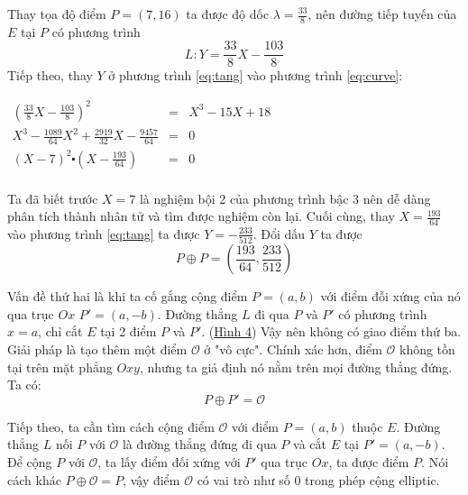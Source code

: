 Thay tọa độ điểm $P = (7,16)$ ta được độ dốc $\lambda = \frac{33}{8}$, nên đường tiếp tuyến của $E$ tại $P$ có phương trình
\begin{equation}
	\label{eq:tang}
	L: Y = \frac{33}{8}X - \frac{103}{8}
\end{equation}
Tiếp theo, thay $Y$ ở phương trình \eqref{eq:tang} vào phương trình \eqref{eq:curve}:
\begin{center}

	$
		\begin{array}{rcl}
			(\frac{33}{8}X - \frac{103}{8})^2                             & = & X^3 -15X+18 \\
			X^3 - \frac{1089}{64}X^2 + \frac{2919}{32}X - \frac{9457}{64} & = & 0           \\
			(X-7)^2 \centerdot (X-\frac{193}{64})                         & = & 0           \\
		\end{array}
	$
\end{center}
Ta đã biết trước $X=7$ là nghiệm bội 2 của phương trình bậc 3 nên dễ dàng phân tích thành nhân tử và tìm được nghiệm còn lại.
Cuối cùng, thay $X=\frac{193}{64}$ vào phương trình \eqref{eq:tang} ta được $Y = -\frac{233}{512}$. Đổi dấu  $Y$ ta được
$$P \oplus P = (\frac{193}{64},\frac{233}{512})$$

Vấn đề thứ hai là khi ta cố gắng cộng điểm $P=(a,b)$ với điểm đỗi xứng của nó qua trục $Ox$ $P'=(a,-b)$.
Đường thẳng $L$ đi qua $P$ và $P'$ có phương trình $x=a$, chỉ cắt $E$ tại 2 điểm $P$ và $P'$. (\hyperref[fg:fg4]{Hình 4})
Vậy nên không có giao điểm thứ ba. Giải pháp là tạo thêm một điểm $\mathcal{O}$ ở "vô cực".
Chính xác hơn, điểm $\mathcal{O}$ không tồn tại trên mặt phẳng $ Oxy$, nhưng ta giả định nó nằm trên mọi đường thẳng đứng.
Ta có:
$$ P \oplus P' = \mathcal{O}$$

Tiếp theo, ta cần tìm cách  cộng điểm $\mathcal{O}$ với điểm $P = (a,b)$ thuộc $E$.
Đường thẳng $L$ nối $P$ với $\mathcal{O}$ là đường thẳng đứng đi qua $P$ và cắt $E$ tại $P'=(a,-b)$.
Để cộng $P$ với $\mathcal{O}$, ta lấy điểm đối xứng với $P'$ qua trục $Ox$, ta được điểm $P$.
Nói cách khác $P \oplus \mathcal{O} = P$, vậy điểm $\mathcal{O}$ có vai trò như số 0 trong phép cộng elliptic.

